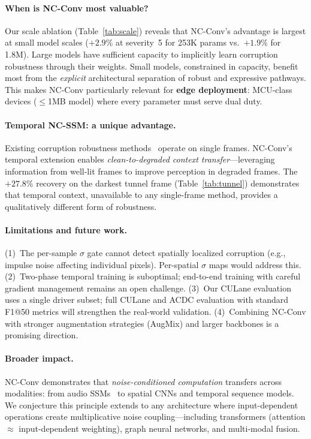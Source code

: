 \documentclass[10pt,twocolumn,letterpaper]{article}
\begin{document}
\paragraph{When is NC-Conv most valuable?}
Our scale ablation (Table~\ref{tab:scale}) reveals that NC-Conv's advantage is largest at small model scales ($+2.9\%$ at severity~5 for 253K params vs.\ $+1.9\%$ for 1.8M).
Large models have sufficient capacity to implicitly learn corruption robustness through their weights.
Small models, constrained in capacity, benefit most from the \emph{explicit} architectural separation of robust and expressive pathways.
This makes NC-Conv particularly relevant for \textbf{edge deployment}: MCU-class devices ($\leq$1MB model) where every parameter must serve dual duty.

\paragraph{Temporal NC-SSM: a unique advantage.}
Existing corruption robustness methods~\cite{hendrycks2020augmix,hendrycks2021deepaugment} operate on single frames.
NC-Conv's temporal extension enables \emph{clean-to-degraded context transfer}---leveraging information from well-lit frames to improve perception in degraded frames.
The $+27.8\%$ recovery on the darkest tunnel frame (Table~\ref{tab:tunnel}) demonstrates that temporal context, unavailable to any single-frame method, provides a qualitatively different form of robustness.

\paragraph{Limitations and future work.}
(1)~The per-sample $\sigma$ gate cannot detect spatially localized corruption (e.g., impulse noise affecting individual pixels). Per-spatial $\sigma$ maps would address this.
(2)~Two-phase temporal training is suboptimal; end-to-end training with careful gradient management remains an open challenge.
(3)~Our CULane evaluation uses a single driver subset; full CULane and ACDC evaluation with standard F1@50 metrics will strengthen the real-world validation.
(4)~Combining NC-Conv with stronger augmentation strategies (AugMix) and larger backbones is a promising direction.

\paragraph{Broader impact.}
NC-Conv demonstrates that \emph{noise-conditioned computation} transfers across modalities: from audio SSMs~\cite{choi2026ncssm} to spatial CNNs and temporal sequence models.
We conjecture this principle extends to any architecture where input-dependent operations create multiplicative noise coupling---including transformers (attention $\approx$ input-dependent weighting), graph neural networks, and multi-modal fusion.
\end{document}
